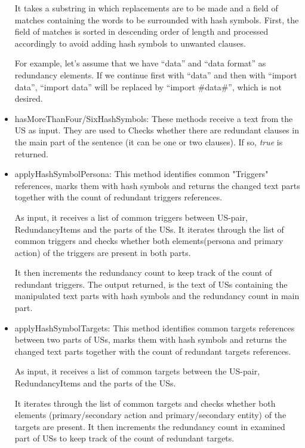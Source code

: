 \begin{itemize}
	It takes a substring in which replacements are to be made and a field of matches containing the words to be surrounded with hash symbols. First, the field of matches is sorted in descending order of length and processed accordingly to avoid adding hash symbols to unwanted clauses. 
	\begin{example}
		For example, let's assume that we have \enquote{data} and \enquote{data format} as redundancy elements. If we continue first with \enquote{data} and then with \enquote{import data}, \enquote{import data} will be replaced by \enquote{import \#data\#}, which is not desired.
	\end{example}
	\item hasMoreThanFour/SixHashSymbols: These methods receive a text from the US as input. They are used to Checks whether there are redundant clauses in the main part of the sentence (it can be one or two clauses). If so, \textit{true} is returned.
	
	\item applyHashSymbolPersona: This method identifies common "Triggers" references, marks them with hash symbols and returns the changed text parts together with the count of redundant triggers references. 
	
	As input, it receives a list of common triggers between US-pair, RedundancyItems and the parts of the USs. It iterates through the list of common triggers and checks whether both elements(persona and primary action) of the triggers are present in both parts. 
	
	It then increments the redundancy count to keep track of the count of redundant triggers. The output returned, is the text of USs containing the manipulated text parts with hash symbols and the redundancy count in main part.
	
	\item applyHashSymbolTargets: This method identifies common targets references between two parts of USs, marks them with hash symbols and returns the changed text parts together with the count of redundant targets references.
	
	As input, it receives a list of common targets between the US-pair, RedundancyItems and the parts of the USs. 
	
	It iterates through the list of common targets and checks whether both elements (primary/secondary action and primary/secondary entity) of the targets are present. It then increments the redundancy count in examined part of USs to keep track of the count of redundant targets. 
	

\end{itemize}
